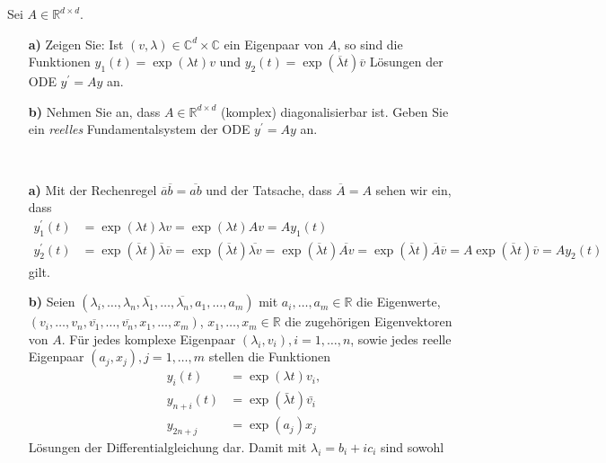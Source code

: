 \begin{exercise}
Sei $A \in \mathbb{R}^{d\times d}$.
\begin{itemize}
  \item [\textbf{a)}]Zeigen Sie: Ist $(v,\lambda) \in \mathbb{C}^d
  \times \mathbb{C}$ ein Eigenpaar von $A$, so sind die Funktionen
  $y_1(t) = \exp(\lambda t)v$ und $y_2(t) = \exp(\overline{\lambda}t)\overline{v}$
  Lösungen der ODE $y^{\prime} = Ay$ an.
  \item [\textbf{b)}] Nehmen Sie an, dass $A \in \mathbb{R}^
  {d \times d}$ (komplex) diagonalisierbar ist. Geben Sie ein
  \textit{reelles} Fundamentalsystem der ODE $y^{\prime} = Ay$ an.
\end{itemize}
\end{exercise}
\begin{solution}
\leavevmode \\
\begin{itemize}
  \item [\textbf{a)}]
  Mit der Rechenregel $\overline{a}\overline{b} = \overline{ab}$ und der Tatsache, dass $\overline{A} = A$
  sehen wir ein, dass
  \begin{align*}
    y_1^{\prime}(t) &= \exp(\lambda t)\lambda v = \exp(\lambda t)A v = Ay_1(t) \\
    y_2^{\prime}(t) &= \exp(\overline{\lambda}t)\overline{\lambda}\overline{v} = \exp(\overline{\lambda}t) \overline{\lambda v} =
    \exp(\overline{\lambda}t) \overline{Av} =  \exp(\overline{\lambda}t) \overline{A}\overline{v} = A\exp(\overline{\lambda}t)\overline{v} = Ay_2(t)
  \end{align*}
  gilt.
  \item [\textbf{b)}]
  Seien $(\lambda_i,\dots,\lambda_n,\overline{\lambda_1},\dots,\overline{\lambda_n},a_1,\dots,a_m)$
  mit $a_i,\dots,a_m \in \mathbb{R}$ die Eigenwerte, \\
  $(v_i,\dots,v_n,\overline{v_1},\dots,\overline{v_n},x_1,\dots,x_m)$, $x_1,\dots,x_m \in \mathbb{R}$
  die zugehörigen Eigenvektoren von $A$.
  Für jedes komplexe Eigenpaar $(\lambda_i, v_i), i = 1,\dots,n$, sowie jedes
  reelle Eigenpaar $(a_j,x_j), j = 1,\dots,m$ stellen die Funktionen
  \begin{align*}
    y_{i}(t) &= \exp(\lambda t)v_i, \\
    y_{n + i}(t) &= \exp(\bar{\lambda} t)\bar{v_i} \\
    y_{2n + j} &= \exp(a_j)x_j
  \end{align*}
  Lösungen der Differentialgleichung dar. Damit mit $\lambda_i = b_i + ic_i$ sind sowohl

\end{itemize}
\end{solution}
